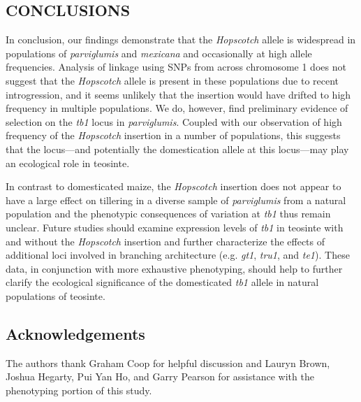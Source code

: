 \documentclass[11pt]{article} %
\begin{document}
\begin{linenumbers}
\begin{flushleft}
\begin{centering}
\section*{CONCLUSIONS}
\end{centering}

In conclusion, our findings demonstrate that the \emph{Hopscotch} allele is widespread in populations of \emph{parviglumis} and \emph{mexicana} and occasionally at high allele frequencies. 
Analysis of linkage using SNPs from across chromosome 1 does not suggest that the \emph{Hopscotch} allele is present in these populations due to recent introgression, and it seems unlikely that the insertion would have drifted to high frequency in multiple populations. 
We do, however, find preliminary evidence of selection on the \emph{tb1} locus in \emph{parviglumis}.  Coupled with our observation of high frequency of the \emph{Hopscotch} insertion in a number of populations, this suggests that the locus---and potentially the domestication allele at this locus---may play an ecological role in teosinte. 

In contrast to domesticated maize, the \emph{Hopscotch} insertion does not appear to have a large effect on tillering in a diverse sample of \emph{parviglumis} from a natural population and the phenotypic consequences of variation at \emph{tb1} thus remain unclear. Future studies should examine expression levels of \emph{tb1} in teosinte with and without the \emph{Hopscotch} insertion and further characterize the effects of additional loci involved in branching architecture (e.g. \emph{gt1}, \emph{tru1}, and \emph{te1}). These data, in conjunction with more exhaustive phenotyping, should help to further clarify the ecological significance of the domesticated \emph{tb1} allele in natural populations of teosinte.

\clearpage

\subsection*{Acknowledgements}%
The authors thank Graham Coop for helpful discussion and Lauryn Brown, Joshua Hegarty, Pui Yan Ho, and Garry Pearson for assistance with the phenotyping portion of this study.

\clearpage


\end{flushleft}
\end{linenumbers}
\end{document}
